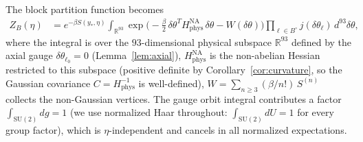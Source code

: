 \documentclass[11pt]{article}
\theoremstyle{definition}
\newcommand{\SU}{\mathrm{SU}}
\newcommand{\R}{\mathbb{R}}
\begin{document}
The block partition function becomes
\begin{align}
Z_B(\eta)&=e^{-\beta S(y_*,\eta)}
\int_{\R^{93}}
\exp\bigl(-\tfrac{\beta}{2}\,\delta\theta^T H_{\mathrm{phys}}^{\mathrm{NA}}
\,\delta\theta-W(\delta\theta)\bigr)
\prod_{\ell\in B^\circ}j(\delta\theta_\ell)\,d^{93}\delta\theta,
\label{eq:Zfluct}
\end{align}
where the integral is over the $93$-dimensional physical subspace
$\R^{93}$ defined by the axial gauge $\delta\theta_{\ell_0}=0$
(Lemma~\ref{lem:axial}), $H_{\mathrm{phys}}^{\mathrm{NA}}$ is the
non-abelian Hessian restricted to this subspace (positive definite by
Corollary~\ref{cor:curvature}, so the Gaussian covariance
$C=H_{\mathrm{phys}}^{-1}$ is well-defined),
$W=\sum_{n\ge 3}(\beta/n!)\,S^{(n)}$ collects the
non-Gaussian vertices.  The gauge orbit integral contributes a factor
$\int_{\SU(2)}dg=1$ (we use normalized Haar throughout:
$\int_{\SU(2)}dU=1$ for every group factor), which is
$\eta$-independent and cancels in all normalized expectations.
\end{document}
